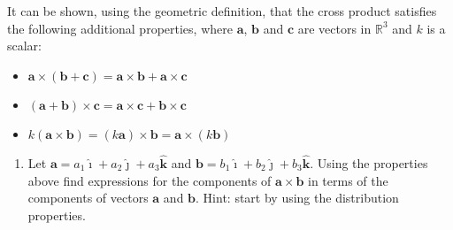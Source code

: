 \documentclass[12pt,letterpaper,fleqn]{article}
\let\oldhat\hat
\renewcommand{\hat}[1]{\oldhat{\boldsymbol{\mathbf{#1}}}}
\renewcommand{\i}{\ensuremath{\hat{\imath}}}
\renewcommand{\j}{\ensuremath{\hat{\jmath}}}
\renewcommand{\k}{\ensuremath{\mathbf{\oldhat{k}}}}
\renewcommand{\vec}[1]{\ensuremath{\pmb{#1}}}
\renewcommand{\v}[1]{\ensuremath{\vec{#1}}}
\begin{document}
It can be shown, using the geometric definition, that the cross product satisfies the following additional properties, where $\v{a}$, $\v{b}$ and $\v{c}$ are vectors in $\mathbb{R}^3$ and $k$ is a scalar:
\begin{itemize}
  \item $\v{a}\times(\v{b} + \v{c}) = \v{a}\times\v{b} + \v{a}\times\v{c}$
  \item $(\v{a} + \v{b})\times\v{c} = \v{a}\times\v{c} + \v{b}\times\v{c}$
  \item $k(\v{a}\times\v{b}) = (k\v{a})\times\v{b} = \v{a}\times(k\v{b})$
\end{itemize}
\begin{enumerate}[resume]
  \item Let $\v{a}=a_1\i + a_2\j + a_3\k$ and $\v{b}=b_1\i + b_2\j + b_3\k$. Using the properties above find expressions for the components of $\v{a}\times\v{b}$ in terms of the components of vectors $\v{a}$ and $\v{b}$. Hint: start by using the distribution properties.
\end{enumerate}
\end{document}

